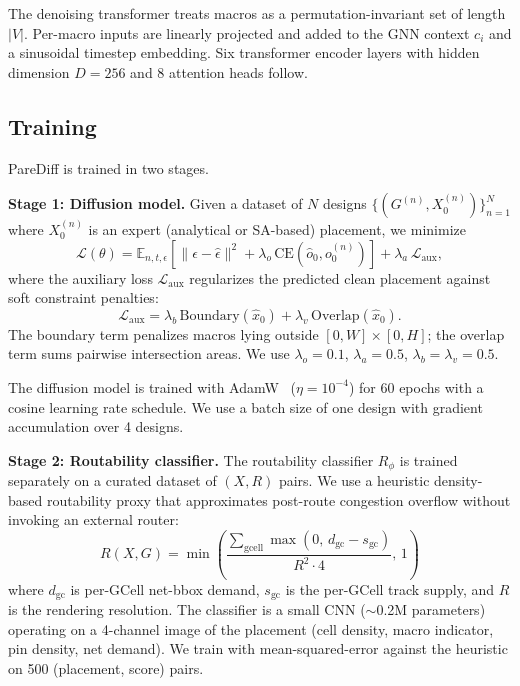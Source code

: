 \documentclass{ieeeaccess}
\begin{document}
The denoising transformer treats macros as a permutation-invariant set of length $|V|$. Per-macro inputs are linearly projected and added to the GNN context $c_i$ and a sinusoidal timestep embedding. Six transformer encoder layers with hidden dimension $D=256$ and 8 attention heads follow.

\subsection{Training}

PareDiff is trained in two stages.

\textbf{Stage 1: Diffusion model.}
Given a dataset of $N$ designs $\{(G^{(n)}, X^{(n)}_0)\}_{n=1}^N$ where $X^{(n)}_0$ is an expert (analytical or SA-based) placement, we minimize
\begin{equation}
\mathcal{L}(\theta) = \mathbb{E}_{n, t, \epsilon}\!\!\left[ \|\epsilon - \hat\epsilon\|^2 + \lambda_o\, \textrm{CE}(\hat{o}_0, o^{(n)}_0) \right] + \lambda_a\, \mathcal{L}_\textrm{aux},
\label{eq:total_loss}
\end{equation}
where the auxiliary loss $\mathcal{L}_\textrm{aux}$ regularizes the predicted clean placement against soft constraint penalties:
\begin{equation}
\mathcal{L}_\textrm{aux} = \lambda_b\, \textrm{Boundary}(\hat{x}_0) + \lambda_v\, \textrm{Overlap}(\hat{x}_0).
\end{equation}
The boundary term penalizes macros lying outside $[0, W] \times [0, H]$; the overlap term sums pairwise intersection areas. We use $\lambda_o = 0.1$, $\lambda_a = 0.5$, $\lambda_b = \lambda_v = 0.5$.

The diffusion model is trained with AdamW~\cite{loshchilov2019adamw} ($\eta = 10^{-4}$) for 60 epochs with a cosine learning rate schedule. We use a batch size of one design with gradient accumulation over 4 designs.

\textbf{Stage 2: Routability classifier.}
The routability classifier $R_\phi$ is trained separately on a curated dataset of $(X, R)$ pairs. We use a heuristic density-based routability proxy that approximates post-route congestion overflow without invoking an external router:
\begin{equation}
R(X, G) = \min\!\left(\!\frac{\sum_{\textrm{gcell}}\!\max(0,\, d_\textrm{gc} - s_\textrm{gc})}{R^2 \cdot 4},\, 1\right)
\label{eq:routability_heuristic}
\end{equation}
where $d_\textrm{gc}$ is per-GCell net-bbox demand, $s_\textrm{gc}$ is the per-GCell track supply, and $R$ is the rendering resolution. The classifier is a small CNN ($\sim$0.2M parameters) operating on a 4-channel image of the placement (cell density, macro indicator, pin density, net demand). We train with mean-squared-error against the heuristic on 500 (placement, score) pairs.
\end{document}
